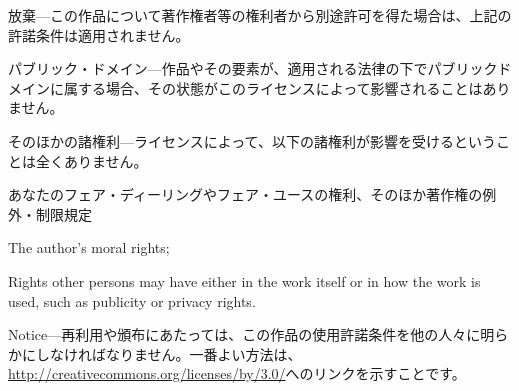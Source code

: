 \begin{aosaitemize}

  \item 放棄---この作品について著作権者等の権利者から別途許可を得た場合は、上記の許諾条件は適用されません。

  \item パブリック・ドメイン---作品やその要素が、適用される法律の下でパブリックドメインに属する場合、その状態がこのライセンスによって影響されることはありません。

  \item そのほかの諸権利---ライセンスによって、以下の諸権利が影響を受けるということは全くありません。
    \begin{aosaitemize}

      \item あなたのフェア・ディーリングやフェア・ユースの権利、そのほか著作権の例外・制限規定

      \item The author's moral rights;

      \item Rights other persons may have either in the work itself or
        in how the work is used, such as publicity or privacy rights.

    \end{aosaitemize}

  \item Notice---再利用や頒布にあたっては、この作品の使用許諾条件を他の人々に明らかにしなければなりません。一番よい方法は、\url{http://creativecommons.org/licenses/by/3.0/}へのリンクを示すことです。

\end{aosaitemize}

